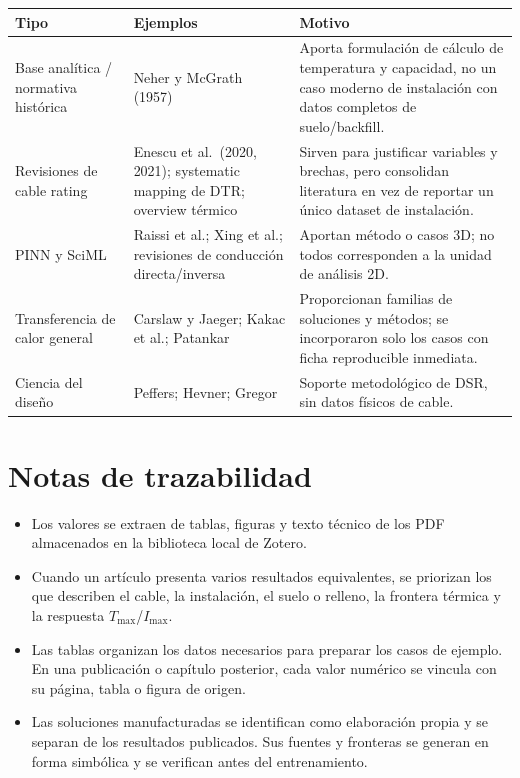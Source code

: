 \documentclass[11pt,a4paper,oneside]{report}
\newcounter{none}
\begin{document}
{\def\LTcaptype{none} %
\begin{longtable}[]{@{}
  >{\raggedright\arraybackslash}p{}
  >{\raggedright\arraybackslash}p{}
  >{\raggedright\arraybackslash}p{}@{}}
\toprule\noalign{}
\begin{minipage}[b]{\linewidth}\raggedright
Tipo
\end{minipage} & \begin{minipage}[b]{\linewidth}\raggedright
Ejemplos
\end{minipage} & \begin{minipage}[b]{\linewidth}\raggedright
Motivo
\end{minipage} \\
\midrule\noalign{}
\endhead
\bottomrule\noalign{}
\endlastfoot
Base analítica / normativa histórica & Neher y McGrath (1957) & Aporta
formulación de cálculo de temperatura y capacidad, no un caso moderno de
instalación con datos completos de suelo/backfill. \\
Revisiones de cable rating & Enescu et al.~(2020, 2021); systematic
mapping de DTR; overview térmico & Sirven para justificar variables y
brechas, pero consolidan literatura en vez de reportar un único dataset
de instalación. \\
PINN y SciML & Raissi et al.; Xing et al.; revisiones de conducción
directa/inversa & Aportan método o casos 3D; no todos corresponden a la
unidad de análisis 2D. \\
Transferencia de calor general & Carslaw y Jaeger; Kakac et al.;
Patankar & Proporcionan familias de soluciones y métodos; se
incorporaron solo los casos con ficha reproducible inmediata. \\
Ciencia del diseño & Peffers; Hevner; Gregor & Soporte metodológico de
DSR, sin datos físicos de cable. \\
\end{longtable}
}

\section{Notas de trazabilidad}\label{notas-de-trazabilidad}

\begin{itemize}
\item
  Los valores se extraen de tablas, figuras y texto técnico de los PDF
  almacenados en la biblioteca local de Zotero.
\item
  Cuando un artículo presenta varios resultados equivalentes, se
  priorizan los que describen el cable, la instalación, el suelo o
  relleno, la frontera térmica y la respuesta \(T_{\max}\)/\(I_{\max}\).
\item
  Las tablas organizan los datos necesarios para preparar los casos de
  ejemplo. En una publicación o capítulo posterior, cada valor numérico
  se vincula con su página, tabla o figura de origen.
\item
  Las soluciones manufacturadas se identifican como elaboración propia y
  se separan de los resultados publicados. Sus fuentes y fronteras se
  generan en forma simbólica y se verifican antes del entrenamiento.
\end{itemize}
\end{document}
